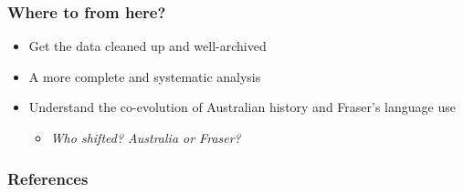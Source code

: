 \documentclass{beamer}       %
\begin{document}
\begin{frame}
	\frametitle{Where to from here?}
	
	\begin{itemize}
	\item Get the data cleaned up and well-archived
	\item A more complete and systematic analysis
	\item Understand the co-evolution of Australian history and Fraser's language use
	\begin{itemize}
	\item \emph{Who shifted? Australia or Fraser?}
	\end{itemize}
	\end{itemize}
\end{frame}




	\begin{frame}[t,allowframebreaks]
	\frametitle{References}
	
	
	\end{frame}
	
	
\end{document}
